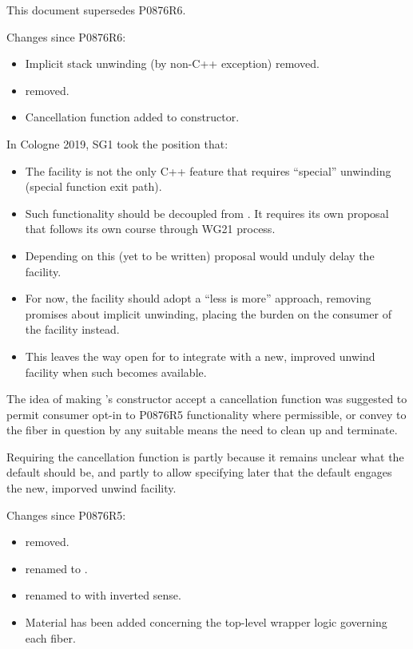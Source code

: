 \label{history}
This document supersedes P0876R6.

Changes since P0876R6:

\begin{itemize}
    \item Implicit stack unwinding (by non-C++ exception) removed.
    \item \unwindfib removed.
    \item Cancellation function added to \fiber constructor.
\end{itemize}

In Cologne 2019, SG1 took the position that:

\begin{itemize}
    \item The  facility is not the only C++ feature that
          requires ``special'' unwinding (special function exit path).
    \item Such functionality should be decoupled from \fiber. It requires its
          own proposal that follows its own course through WG21 process.
    \item Depending on this (yet to be written) proposal would unduly delay
          the  facility.
    \item For now, the  facility should adopt a ``less is
          more'' approach, removing promises about implicit unwinding, placing
          the burden on the consumer of the facility instead.
    \item This leaves the way open for  to integrate with
          a new, improved unwind facility when such becomes available.
\end{itemize}

The idea of making \fiber's constructor accept a cancellation function was
suggested to permit consumer opt-in to P0876R5 functionality where
permissible, or convey to the fiber in question by any suitable means the need
to clean up and terminate.

Requiring the cancellation function is partly because it remains unclear what
the default should be, and partly to allow specifying later that the default
engages the new, imporved unwind facility.

Changes since P0876R5:

\begin{itemize}
    \item {} removed.
    \item {} renamed to
      \canxtresume.
    \item {} renamed to  with inverted
      sense.
    \item Material has been added concerning the top-level wrapper
      logic governing each fiber.
\end{itemize}

